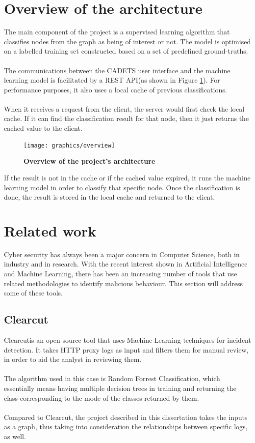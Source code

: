 	\section{Overview of the architecture}\label{1.2}
	The main component of the project is a supervised learning algorithm that classifies nodes from the graph as being of interest or not. The model is optimised on a labelled training set constructed based on a set of predefined ground-truths.
	\\ \\
	The communications between the CADETS user interface and the machine learning model is facilitated by a REST API(as shown in Figure \ref{Figure 1.2}). For performance purposes, it also uses a local cache of previous classifications. 
	\\ \\ 
	When it receives a request from the client, the server would first check the local cache. If it can find the classification result for that node, then it just returns the cached value to the client.
	\begin{figure}[H]
		\centering
		\texttt{[image: graphics/overview]}
		\label{Figure 1.2}
		\caption{\bf Overview of the project's architecture}
	\end{figure}
	
	If the result is not in the cache or if the cached value expired, it runs the machine learning model in order to classify that specific node. Once the classification is done, the result is stored in the local cache and returned to the client. 
	
	\section{Related work}
	Cyber security has always been a major concern in Computer Science, both in industry and in research. With the recent interest shown in Artificial Intelligence and Machine Learning, there has been an increasing number of tools that use related methodologies to identify malicious behaviour. This section will address some of these tools. 
	
	\subsection{Clearcut}
	Clearcut\footnotemark[1] is an open source tool that uses Machine Learning techniques for incident detection. It takes HTTP proxy logs as input and filters them for manual review, in order to aid the analyst in reviewing them. 
	\\ \\ 
	The algorithm used in this case is Random Forrest Classification, which essentially means having multiple decision trees in training and returning the class corresponding to the mode of the classes returned by them. 
	\\ \\
	Compared to Clearcut, the project described in this dissertation takes the inputs as a graph, thus taking into consideration the relationships between specific logs, as well. 
	

